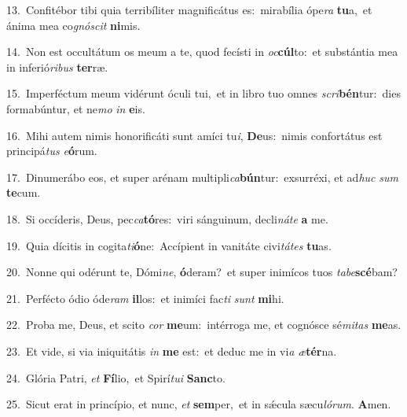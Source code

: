 {\numbfont\textcolor{\numbcolor}{13.}}~Confitébor tibi quia terribíliter magnificátus es:~\dagger mirabília ópe\textit{ra} \textbf{tu}\-a,~\star et ánima mea co\-\textit{gnó}\-\textit{scit} \textbf{ni}\-mis.\par
{\numbfont\textcolor{\numbcolor}{14.}}~Non est occultátum os meum a te, quod fecísti in \textit{oc}\-\textbf{cúl}to:~\star et substántia mea in inferió\-\textit{ri}\-\textit{bus} \textbf{ter}\-ræ.\par
{\numbfont\textcolor{\numbcolor}{15.}}~Imperféctum meum vidérunt óculi tui,~\dagger et in libro tuo omnes \textit{scri}\-\textbf{bén}tur:~\star dies formabúntur, et ne\textit{mo} \textit{in} \textbf{e}\-is.\par
{\numbfont\textcolor{\numbcolor}{16.}}~Mihi autem nimis honorificáti sunt amíci tu\-\textit{i}\-, \textbf{De}\-us:~\star nimis confortátus est principá\textit{tus} \textit{e}\-\textbf{ó}rum.\par
{\numbfont\textcolor{\numbcolor}{17.}}~Dinumerábo eos, et super arénam multipli\-\textit{ca}\-\textbf{bún}tur:~\star exsurréxi, et ad\textit{huc} \textit{sum} \textbf{te}\-cum.\par
{\numbfont\textcolor{\numbcolor}{18.}}~Si occíderis, Deus, pec\-\textit{ca}\-\textbf{tó}res:~\star viri sánguinum, decli\-\textit{ná}\-\textit{te} \textbf{a} me.\par
{\numbfont\textcolor{\numbcolor}{19.}}~Quia dícitis in cogita\-\textit{ti}\-\textbf{ó}ne:~\star Accípient in vanitáte civi\-\textit{tá}\-\textit{tes} \textbf{tu}\-as.\par
{\numbfont\textcolor{\numbcolor}{20.}}~Nonne qui odérunt te, Dómi\-\textit{ne}\-, \textbf{ó}\-deram?~\star et super inimícos tuos \textit{ta}\-\textit{be}\textbf{scé}bam?\par
{\numbfont\textcolor{\numbcolor}{21.}}~Perfécto ódio óde\textit{ram} \textbf{il}\-los:~\star et inimíci fac\textit{ti} \textit{sunt} \textbf{mi}\-hi.\par
{\numbfont\textcolor{\numbcolor}{22.}}~Proba me, Deus, et scito \textit{cor} \textbf{me}\-um:~\star intérroga me, et cognósce sé\-\textit{mi}\-\textit{tas} \textbf{me}\-as.\par
{\numbfont\textcolor{\numbcolor}{23.}}~Et vide, si via iniquitátis \textit{in} \textbf{me} est:~\star et deduc me in vi\textit{a} \textit{æ}\-\textbf{tér}na.\par
{\numbfont\textcolor{\numbcolor}{24.}}~Glória Patri, \textit{et} \textbf{Fí}\-lio,~\star et Spirí\-\textit{tu}\-\textit{i} \textbf{Sanc}\-to.\par
{\numbfont\textcolor{\numbcolor}{25.}}~Sicut erat in princípio, et nunc, \textit{et} \textbf{sem}\-per,~\star et in sǽcula sæcu\-\textit{ló}\-\textit{rum}. \textbf{A}\-men.\par
